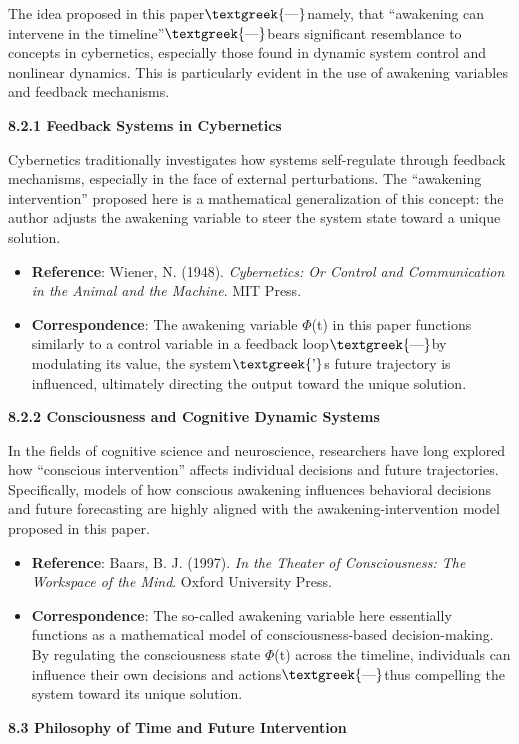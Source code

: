 \documentclass[a4paper]{article}
\begin{document}
The idea proposed in this paper$\text{\textgreek{—}}$namely, that “awakening can intervene in the
timeline”$\text{\textgreek{—}}$bears significant resemblance to concepts in cybernetics, especially those found in
dynamic system control and nonlinear dynamics. This is particularly evident in the use of awakening variables and
feedback mechanisms.

\textbf{8.2.1 Feedback Systems in Cybernetics}

Cybernetics traditionally investigates how systems self-regulate through feedback mechanisms, especially in the face of
external perturbations. The “awakening intervention” proposed here is a mathematical generalization of this concept:
the author adjusts the awakening variable to steer the system state toward a unique solution.

\begin{itemize}[series=listWWNumxxii,label=[F0B7?]]
\item \textbf{Reference}: Wiener, N. (1948). \textit{Cybernetics: Or Control and Communication in the Animal and the
Machine}. MIT Press.
\item \textbf{Correspondence}: The awakening variable $\Phi $(t) in this paper functions similarly to a control variable
in a feedback loop$\text{\textgreek{—}}$by modulating its value, the system$\text{\textgreek{’}}$s future trajectory is
influenced, ultimately directing the output toward the unique solution.
\end{itemize}
\textbf{8.2.2 Consciousness and Cognitive Dynamic Systems}

In the fields of cognitive science and neuroscience, researchers have long explored how “conscious intervention” affects
individual decisions and future trajectories. Specifically, models of how conscious awakening influences behavioral
decisions and future forecasting are highly aligned with the awakening-intervention model proposed in this paper.

\begin{itemize}[series=listWWNumxxiii,label=[F0B7?]]
\item \textbf{Reference}: Baars, B. J. (1997). \textit{In the Theater of Consciousness: The Workspace of the Mind}.
Oxford University Press.
\item \textbf{Correspondence}: The so-called awakening variable here essentially functions as a mathematical model of
consciousness-based decision-making. By regulating the consciousness state $\Phi $(t) across the timeline, individuals
can influence their own decisions and actions$\text{\textgreek{—}}$thus compelling the system toward its unique
solution.
\end{itemize}
\textbf{8.3 Philosophy of Time and Future Intervention}
\end{document}
